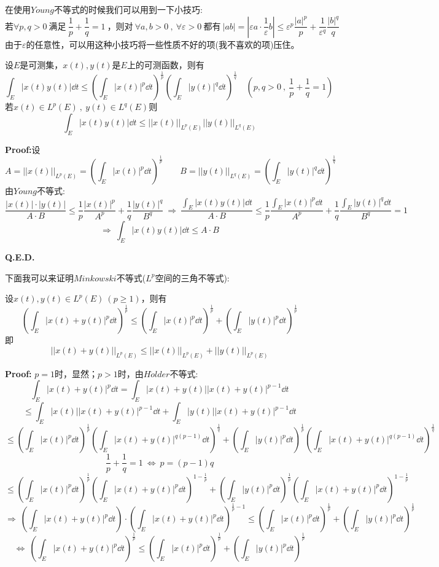 在使用$Young$不等式的时候我们可以用到一下小技巧:
\[\text{若} \forall p,q>0 \ \text{满足} \ \frac{1}{p}+\frac{1}{q}=1 \ \text{，则对} \ \forall a,b>0 \ , \ \forall \varepsilon>0 \ \text{都有} \ |ab|=|\varepsilon a \cdot \frac{1}{\varepsilon}b| \leq \varepsilon^p\frac{|a|^p}{p}+\frac{1}{\varepsilon^q}\frac{|b|^q}{q}\]
由于$\varepsilon$的任意性，可以用这种小技巧将一些性质不好的项(我不喜欢的项)压住。
\begin{theorem}
    设$E$是可测集，$x(t),y(t)$是$E$上的可测函数，则有
    \[\int_E|x(t)y(t)|\dd t \leq \left(\int_E|x(t)|^p\dd t\right)^{\frac{1}{p}}\left(\int_E|y(t)|^q\dd t\right)^{\frac{1}{q}} \quad (p,q>0 \ , \ \frac{1}{p}+\frac{1}{q}=1)\]
    若$x(t) \in L^p(E) \ , \ y(t) \in L^q(E)$则
    \[\int_E|x(t)y(t)|\dd t \leq ||x(t)||_{L^p(E)}||y(t)||_{L^q(E)}\]
\end{theorem}
\textbf{Proof:}设
\[A=||x(t)||_{L^p(E)}=\left(\int_E|x(t)|^p\dd t\right)^{\frac{1}{p}} \qquad B=||y(t)||_{L^q(E)}=\left(\int_E|y(t)|^q\dd t\right)^{\frac{1}{q}}\]
由$Young$不等式:
\[\frac{|x(t)| \cdot |y(t)|}{A \cdot B} \leq \frac{1}{p}\frac{|x(t)|^p}{A^p}+\frac{1}{q}\frac{|y(t)|^q}{B^q} \ \Rightarrow \ \frac{\int_E|x(t)y(t)|\dd t}{A \cdot B} \leq \frac{1}{p}\frac{\int_E|x(t)|^p\dd t}{A^p}+\frac{1}{q}\frac{\int_E|y(t)|^q\dd t}{B^q}=1\]
\[\Rightarrow \ \int_E|x(t)y(t)|\dd t \leq A \cdot B\]

\textbf{Q.E.D.}

下面我可以来证明$Minkowski$不等式($L^p$空间的三角不等式):
\begin{theorem}
    设$x(t),y(t) \in L^p(E) \ (p \geq 1)$，则有
    \[\left(\int_E|x(t)+y(t)|^p\dd t\right)^{\frac{1}{p}} \leq \left(\int_E|x(t)|^p\dd t\right)^{\frac{1}{p}}+\left(\int_E|y(t)|^p\dd t\right)^{\frac{1}{p}}\]
    即
    \[||x(t)+y(t)||_{L^p(E)} \leq ||x(t)||_{L^p(E)}+||y(t)||_{L^p(E)}\]
\end{theorem}
\textbf{Proof:} $p=1$时，显然；$p>1$时，由$H\ddot{o}lder$不等式:
\[\int_E|x(t)+y(t)|^p\dd t=\int_E|x(t)+y(t)||x(t)+y(t)|^{p-1}\dd t\]
\[\leq \int_E|x(t)||x(t)+y(t)|^{p-1}\dd t+\int_E|y(t)||x(t)+y(t)|^{p-1}\dd t\]
\[\leq \left(\int_E|x(t)|^p\dd t\right)^{\frac{1}{p}}\left(\int_E|x(t)+y(t)|^{q(p-1)}\dd t\right)^{\frac{1}{q}}+\left(\int_E|y(t)|^p\dd t\right)^{\frac{1}{p}}\left(\int_E|x(t)+y(t)|^{q(p-1)}\dd t\right)^{\frac{1}{q}}\]
\[\frac{1}{p}+\frac{1}{q}=1 \ \Leftrightarrow \ p=(p-1)q\]
\[\leq \left(\int_E|x(t)|^p\dd t\right)^{\frac{1}{p}}\left(\int_E|x(t)+y(t)|^{p}\dd t\right)^{1-\frac{1}{p}}+\left(\int_E|y(t)|^p\dd t\right)^{\frac{1}{p}}\left(\int_E|x(t)+y(t)|^{p}\dd t\right)^{1-\frac{1}{p}}\]
\[\Rightarrow \ \left(\int_E|x(t)+y(t)|^p\dd t\right) \cdot \left(\int_E|x(t)+y(t)|^{p}\dd t\right)^{\frac{1}{p}-1} \leq \left(\int_E|x(t)|^p\dd t\right)^{\frac{1}{p}}+\left(\int_E|y(t)|^p\dd t\right)^{\frac{1}{p}}\]
\[\Leftrightarrow \ \left(\int_E|x(t)+y(t)|^{p}\dd t\right)^{\frac{1}{p}} \leq \left(\int_E|x(t)|^p\dd t\right)^{\frac{1}{p}}+\left(\int_E|y(t)|^p\dd t\right)^{\frac{1}{p}}\]

